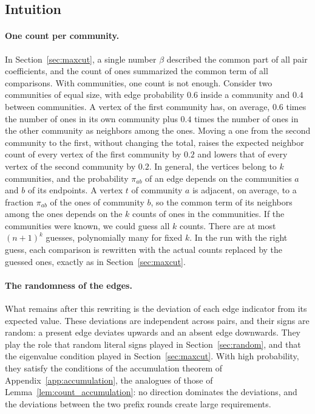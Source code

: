 \documentclass[11pt,a4paper]{article}
\theoremstyle{definition}
\theoremstyle{remark}
\begin{document}
\subsection{Intuition}\label{sec:sbm_intuition}

\paragraph{One count per community.}
In Section~\ref{sec:maxcut}, a single number $\beta$ described the common
part of all pair coefficients, and the count of ones summarized the common
term of all comparisons. With communities, one count is not enough.
Consider two communities of equal size, with edge probability $0.6$ inside
a community and $0.4$ between communities. A vertex of the first community
has, on average, $0.6$ times the number of ones in its own community plus
$0.4$ times the number of ones in the other community as neighbors among
the ones. Moving a one from the second community to the first, without
changing the total, raises the expected neighbor count of every vertex of
the first community by $0.2$ and lowers that of every vertex of the second
community by $0.2$. In general, the vertices belong to $k$ communities, and
the probability $\pi_{ab}$ of an edge depends on the communities $a$ and $b$
of its endpoints. A vertex $t$ of community $a$ is adjacent, on average, to
a fraction $\pi_{ab}$ of the ones of community $b$, so the common term of
its neighbors among the ones depends on the $k$ counts of ones in the
communities. If the communities were known, we could guess all $k$ counts.
There are at most $(n+1)^k$ guesses, polynomially many for fixed $k$. In
the run with the right guess, each comparison is rewritten with the actual
counts replaced by the guessed ones, exactly as in
Section~\ref{sec:maxcut}.

\paragraph{The randomness of the edges.}
What remains after this rewriting is the deviation of each edge indicator
from its expected value. These deviations are independent across pairs, and
their signs are random: a present edge deviates upwards and an absent edge
downwards. They play the role that random literal signs played in
Section~\ref{sec:random}, and that the eigenvalue condition played in
Section~\ref{sec:maxcut}. With high probability, they satisfy the
conditions of the accumulation theorem of Appendix~\ref{app:accumulation},
the analogues of those of Lemma~\ref{lem:count_accumulation}: no direction
dominates the deviations, and the deviations between the two prefix rounds
create large requirements.
\end{document}
